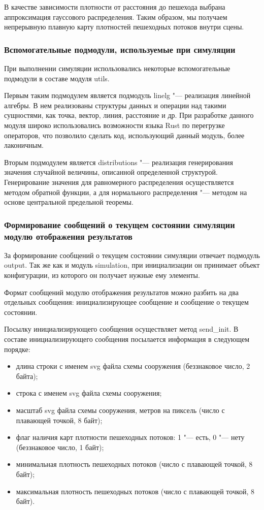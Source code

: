В качестве зависимости плотности от расстояния до пешехода выбрана аппроксимация гауссового распределения.
Таким образом, мы получаем непрерывную плавную карту плотностей пешеходных потоков внутри сцены.

\subsubsection{Вспомогательные подмодули, используемые при симуляции}
\label{sec:development:core:utils}

При выполнении симуляции использовались некоторые вспомогательные подмодули в составе модуля utils.

Первым таким подмодулем является подмодуль linelg "--- реализация линейной алгебры.
В нем реализованы структуры данных и операции над такими сущностями, как точка, вектор, линия, расстояние и др.
При разработке данного модуля широко использовались возможности языка Rust по перегрузке операторов,
что позволило сделать код, использующий данный модуль, более лаконичным.

Вторым подмодулем является distributions "--- реализация генерирования значения случайной величины, описанной определенной структурой.
Генерирование значения для равномерного распределения осуществляется методом обратной функции,
а для нормального распределения "--- методом на основе центральной предельной теоремы.

\subsubsection{Формирование сообщений о текущем состоянии симуляции модулю отображения результатов}
\label{sec:development:core:output}

За формирование сообщений о текущем состоянии симуляции отвечает подмодуль output.
Так же как и модуль simulation, при инициализации он принимает объект конфигурации, из которого он получает нужные ему элементы.

Формат сообщений модулю отображения результатов можно разбить на два отдельных сообщения: инициализирующее сообщение и сообщение о текущем состоянии.

Посылку инициализирующего сообщения осуществляет метод se\-nd\_in\-it.
В составе инициализирующего сообщения посылается информация в следующем порядке:
\begin{itemize}
  \item длина строки с именем svg файла схемы сооружения (беззнаковое число, 2 байта);
  \item строка с именем svg файла схемы сооружения;
  \item масштаб svg файла схемы сооружения, метров на пиксель (число с плавающей точкой, 8 байт);
  \item флаг наличия карт плотности пешеходных потоков: 1 "--- есть, 0 "--- нету (беззнаковое число, 1 байт);
  \item минимальная плотность пешеходных потоков (число с плавающей точкой, 8 байт);
  \item максимальная плотность пешеходных потоков (число с плавающей точкой, 8 байт).
\end{itemize}

